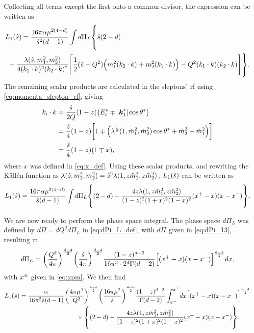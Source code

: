 Collecting all terms except the first onto a common divisor, the expression can be written as
\begin{equation}
\begin{split}
    L_1(\shat)
    &= \frac{16\pi\alpha\mu^{2(4-d)}}
    {\shat^2(d-1)} \int d\Pi_L \vastl\{
        \shat(2-d)
        \\ &\hspace{-2em}
        +\frac{\lambda(\shat,m_1^2,m_2^2)}{4(k_1\cdot k)^2(k_2\cdot k)^2}
        \Biggl[
            \frac{1}{2}(\shat-Q^2) \Bigl( m_1^2(k_2\cdot k)
            + m_2^2(k_1\cdot k) \Bigr)
            - Q^2 (k_1\cdot k)(k_2\cdot k)
        \Biggr]
    \vastr\}.
\end{split}
\end{equation}
The remaining scalar products are calculated in the sleptons' \gls{rf} using \cref{eq:momenta_slepton_rf}, giving
\begin{align}
    k_i\cdot k &= \frac{\hat{s}}{2Q}(1-z)
    \bigl(E_i^* \mp \lvert\boldsymbol{k}_1^*\rvert\cos\theta^* \bigr)
    \nonumber \\
    &= \frac{\hat{s}}{4}(1-z)
    \biggl[1\mp \Bigl(\lambda^{\frac{1}{2}}(1,\tilde{m}_1^2,\tilde{m}_2^2)\cos\theta^* + \tilde{m}_2^2-\tilde{m}_1^2\Bigr) \biggr]
    \nonumber \\
    &= \frac{\hat{s}}{4}(1-z)(1\mp x),
\end{align}
where $x$ was defined in \cref{eq:x_def}.
Using these scalar products, and rewriting the K\"all\'en function as $\lambda(\hat{s},m_1^2,m_2^2)=\hat{s}^2\lambda(1,z\tilde{m}_1^2,z\tilde{m}_2^2)$, $L_1(\hat{s})$ can be written as
\begin{equation}
    L_1(\shat)
    = \frac{16\pi\alpha\mu^{2(4-d)}}{\shat(d-1)}
    \int d\Pi_L \vastl\{
        (2-d)
        -\frac{4z \lambda(1,z\mt_1^2,z\mt_2^2)}{(1-z)^2 (1+x)^2 (1-x)^2}
        (\xp-x)(x-\xm)
    \vastr\}.
    \label{eq:L1_dPiL}
\end{equation}

We are now ready to perform the phase space integral.
The phase space $d\Pi_L$ was defined by $d\Pi=dQ^2d\Pi_L$ in \cref{eq:dPi_L_def}, with $d\Pi$ given in \cref{eq:dPi_13}, resulting in
\begin{equation}
    d\Pi_L =
    \biggl(\frac{Q^2}{4\pi}\biggr)^{\frac{d-4}{2}}
    \biggl(\frac{\hat{s}}{4\pi}\biggr)^{\frac{d-4}{2}}
    \frac{(1-z)^{d-3}}{16\pi^3 \cdot 2^d \Gamma(d-2)}
    \Bigl[ (x^+-x)(x-x^-) \Bigr]^{\frac{d-4}{2}}
    dx,
    \label{eq:dPi_L}
\end{equation}
with $x^\pm$ given in \cref{eq:xpm}.
We then find
\begin{equation}
\begin{split}
    L_1(\shat)
    &= \frac{\alpha}{16\pi^2 \shat(d-1)}
    \biggl(\frac{4\pi\mu^2}{Q^2}\biggr)^{\frac{4-d}{2}}
    \biggl(\frac{16\pi\mu^2}{\shat}\biggr)^{\frac{4-d}{2}}
    \frac{(1-z)^{d-3}}{\Gamma(d-2)}
    \int_{\xm}^{\xp} \! dx \Bigl[ (\xp-x)(x-\xm) \Bigr]^{\frac{d-4}{2}}
    \\ &\hspace{9em} \times
    \vastl\{
        (2-d)
        -\frac{4z \lambda(1,z\mt_1^2,z\mt_2^2)}{(1-z)^2 (1+x)^2 (1-x)^2}
        (\xp-x)(x-\xm)
    \vastr\}.
\end{split}
\label{eq:L1_dx}
\end{equation}

